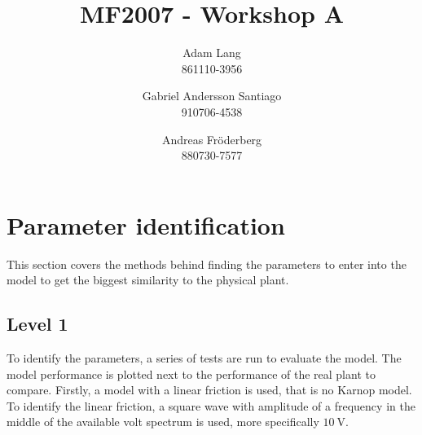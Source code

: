 \documentclass[12pt,a4paper]{article}
\title{MF2007 - Workshop A}
\author{
Adam Lang \\ 861110-3956
\and
Gabriel Andersson Santiago \\ 910706-4538
\and 
Andreas Fr\"oderberg \\ 880730-7577
}
\begin{document}
\maketitle

\section*{Parameter identification}
This section covers the methods behind finding the parameters to enter into the
model to get the biggest similarity to the physical plant.

\subsection*{Level 1}
To identify the parameters, a series of tests are run to evaluate the model. The
model performance is plotted next to the performance of the real plant to
compare. Firstly, a model with a linear friction is used, that is no Karnop
model. To identify the linear friction, a square wave with amplitude of a
frequency in the middle of the available volt spectrum is used, more
specifically $10~\text{V}$. 
 
\end{document}
